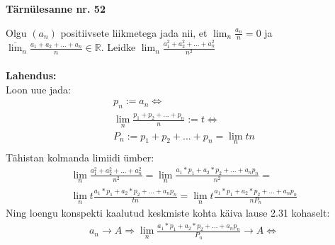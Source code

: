 \documentclass{article}
\begin{document}
\begin{center}
\Large\textbf{T\"arn\"ulesanne nr. 52}\\
\end{center}
Olgu $(a_n)$ positiivsete liikmetega jada nii, et $\displaystyle\lim_n \frac{a_n}{n}=0$ ja\\ $\displaystyle\overline\lim_n \frac{a_1+a_2+...+a_n}{n}\in\mathbb{R}$. Leidke $\displaystyle\lim_n \frac{a_1^2+a_2^2+...+a_n^2}{n^2}$\\\\
\textbf{Lahendus:}\\
Loon uue jada:
\begin{equation*}
\begin{aligned}
p_n:=a_n\iff\\
\lim_n \frac{p_1+p_2+...+p_n}{n}:=t\iff\\
P_n:=p_1+p_2+...+p_n=\lim_n tn\\
\end{aligned}
\end{equation*}
T\"ahistan kolmanda limiidi \"umber:
\begin{equation*}
\begin{aligned}
\lim_n \frac{a_1^2+a_2^2+...+a_n^2}{n^2}=\lim_n \frac{a_1*p_1+a_2*p_2+...+a_np_n}{n^2}=\\
\lim_n t\frac{a_1*p_1+a_2*p_2+...+a_np_n}{tn}=\lim_n t\frac{a_1*p_1+a_2*p_2+...+a_np_n}{nP_n}
\end{aligned}
\end{equation*}
Ning loengu konspekti kaalutud keskmiste kohta k\"aiva lause 2.31 kohaselt:
\begin{equation*}
\begin{aligned}
a_n\rightarrow A\Rightarrow\lim_n \frac{a_1*p_1+a_2*p_2+...+a_np_n}{P_n}\rightarrow A\iff\\
\\
\end{aligned}
\end{equation*}
\end{document}
